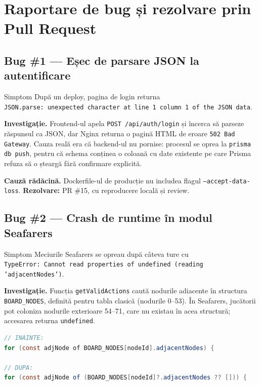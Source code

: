 \documentclass[11pt,a4paper]{article}
\begin{document}
\newpage
\section{Raportare de bug și rezolvare prin Pull Request}

\subsection{Bug \#1 --- Eșec de parsare JSON la autentificare}

\begin{bugbox}{Simptom}
După un deploy, pagina de login returna\\
\texttt{JSON.parse: unexpected character at line 1 column 1 of the JSON data}.
\end{bugbox}

\textbf{Investigație.} Frontend-ul apela \texttt{POST /api/auth/login} și încerca
să parseze răspunsul ca JSON, dar Nginx returna o pagină HTML de eroare
\texttt{502 Bad Gateway}. Cauza reală era că backend-ul nu pornise: procesul se
oprea la \texttt{prisma db push}, pentru că schema conținea o coloană cu date
existente pe care Prisma refuza să o șteargă fără confirmare explicită.

\textbf{Cauză rădăcină.} Dockerfile-ul de producție nu includea flagul
\texttt{--accept-data-loss}. \textbf{Rezolvare:} PR \#15, cu reproducere locală
și review.

\subsection{Bug \#2 --- Crash de runtime în modul Seafarers}

\begin{bugbox}{Simptom}
Meciurile Seafarers se opreau după câteva ture cu\\
\texttt{TypeError: Cannot read properties of undefined (reading 'adjacentNodes')}.
\end{bugbox}

\textbf{Investigație.} Funcția \texttt{getValidActions} caută nodurile adiacente
în structura \texttt{BOARD\_NODES}, definită pentru tabla clasică (nodurile
0--53). În Seafarers, jucătorii pot coloniza nodurile exterioare 54--71, care nu
existau în acea structură; accesarea returna \texttt{undefined}.

\begin{lstlisting}[language=Java,caption={Fix aplicat --- optional chaining pentru noduri exterioare}]
// INAINTE:
for (const adjNode of BOARD_NODES[nodeId].adjacentNodes) {

// DUPA:
for (const adjNode of (BOARD_NODES[nodeId]?.adjacentNodes ?? [])) {
\end{lstlisting}
\end{document}
